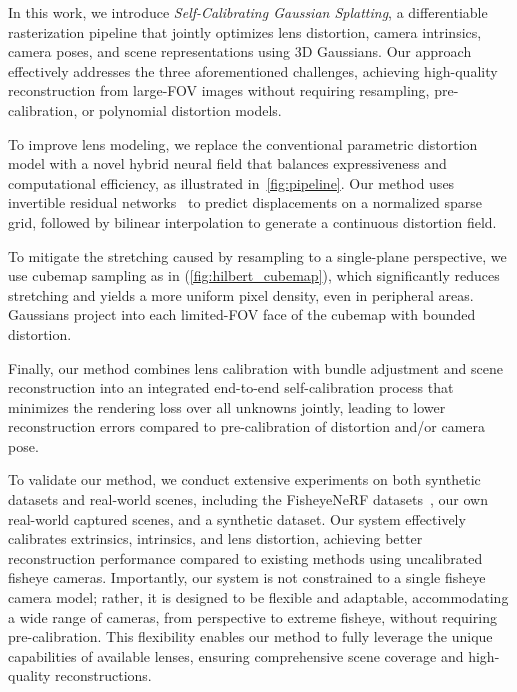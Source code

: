 In this work, we introduce \textit{Self-Calibrating Gaussian Splatting}, a differentiable rasterization pipeline that jointly optimizes lens distortion, camera intrinsics, camera poses, and scene representations using 3D Gaussians. Our approach effectively addresses the three aforementioned challenges, achieving high-quality reconstruction from large-FOV images without requiring resampling, pre-calibration, or polynomial distortion models.

To improve lens modeling, we replace the conventional parametric distortion model with a novel hybrid neural field that balances expressiveness and computational efficiency, as illustrated in~\cref{fig:pipeline}. Our method uses invertible residual networks~\cite{behrmann2019invertible} to predict displacements on a normalized sparse grid, followed by bilinear interpolation to generate a continuous distortion field.

To mitigate the stretching caused by resampling to a single-plane perspective, we use cubemap sampling as in \cite{Cohen:1985:hemicube} (\cref{fig:hilbert_cubemap}), which significantly reduces stretching and yields a more uniform pixel density, even in peripheral areas. Gaussians project into each limited-FOV face of the cubemap with bounded distortion.

Finally, our method combines lens calibration with bundle adjustment and scene reconstruction into an integrated end-to-end self-calibration process that minimizes the rendering loss over all unknowns jointly, leading to lower reconstruction errors compared to pre-calibration of distortion and/or camera pose.


To validate our method, we conduct extensive experiments on both synthetic datasets and real-world scenes, including the FisheyeNeRF datasets~\cite{jeong2021self}, our own real-world captured scenes, and a synthetic dataset. Our system effectively calibrates extrinsics, intrinsics, and lens distortion, achieving better reconstruction performance compared to existing methods using uncalibrated fisheye cameras. Importantly, our system is not constrained to a single fisheye camera model; rather, it is designed to be flexible and adaptable, accommodating a wide range of cameras, from perspective to extreme fisheye, without requiring pre-calibration. This flexibility enables our method to fully leverage the unique capabilities of available lenses, ensuring comprehensive scene coverage and high-quality reconstructions.


